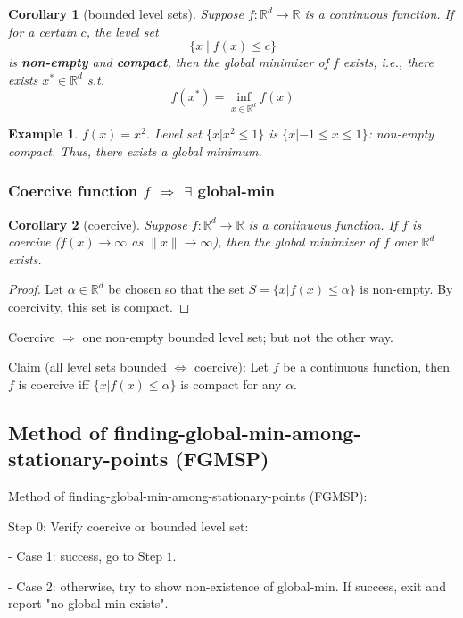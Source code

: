 \documentclass[11pt,a4paper]{article}
\newtheorem{example}{Example}
\newtheorem{corollary}{Corollary}
\begin{document}
\begin{corollary}[bounded level sets]
    Suppose $f: \mathbb{R}^{d} \rightarrow \mathbb{R}$ is a continuous function. If for a certain $c$, the level set
    $$
    \{x \mid f(x) \leq c\}
    $$
    is \textbf{non-empty} and \textbf{compact}, then the global minimizer of $f$ exists, i.e., there exists $x^{*} \in \mathbb{R}^{d}$ s.t.
    $$
    f\left(x^{*}\right)=\inf _{x \in \mathbb{R}^{d}} f(x)
    $$
\end{corollary}
\begin{example}
    $f(x) = x^2$.
    Level set $\{x|x^2 \leq 1\}$ is $\{x|-1\leq x\leq 1\}$: non-empty compact. Thus, there exists a global minimum.
\end{example}

\subsubsection{Coercive function $f$ $\Rightarrow$ $\exists$ global-min}
\begin{corollary}[coercive]
    Suppose $f: \mathbb{R}^{d} \rightarrow \mathbb{R}$ is a continuous function. If $f$ is coercive ($f(x) \rightarrow \infty$ as $\|x\| \rightarrow \infty$), then the global minimizer of $f$ over $\mathbb{R}^{d}$ exists.
\end{corollary}
\begin{proof}
Let $\alpha\in \mathbb{R}^d$ be chosen so that the set $S = \{x |f(x) \leq \alpha\}$ is non-empty. By coercivity,
this set is compact.
\end{proof}
Coercive $\Rightarrow$ one non-empty bounded level set; but not the other way.

Claim (all level sets bounded $\Leftrightarrow$ coercive): Let $f$ be a continuous function, then $f$ is coercive iff $\{x | f(x) \leq \alpha\}$ is compact for any $\alpha$.

\subsection{Method of finding-global-min-among-stationary-points (FGMSP)}
Method of finding-global-min-among-stationary-points (FGMSP):

Step 0: Verify coercive or bounded level set:

- Case 1: success, go to Step $1 .$

- Case 2: otherwise, try to show non-existence of global-min. If success, exit and report "no global-min exists".
\end{document}
